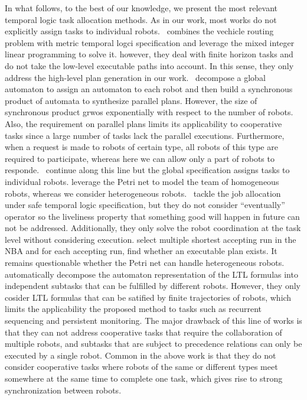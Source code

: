 \documentclass[Afour,sageh,times]{sagej}
\begin{document}
In what follows, to the best of our knowledge, we present the most relevant temporal logic task allocation methods. As in our work, most works do not explicitly assign tasks to individual robots.~\cite{karaman2011linear} combines the vechicle routing problem with metric temporal logci specification and leverage the mixed integer linear programming to solve it. however, they  deal with finite horizon tasks and do not take the low-level executable paths into account. In this sense, they only address the high-level plan generation in our work.~\cite{chen2011formal,leahy2015distributed} decompose a global automaton to assign an automaton to each robot and then  build a synchronous product of automata to synthesize parallel plans. However, the size of synchronous product grwos exponentially with respect to the number of robots. Also, the requirement on parallel plans limits its applicability to cooperative tasks since a large number of tasks lack the parallel executions. Furthermore, when a request is made to robots of certain type, all robots of this type  are required to participate, whereas here we can allow only a part of robots to responde.~\cite{ulusoy2013optimality} continue along this line but
the global specification assigns tasks to individual robots. \cite{lacerda2019petri,kloetzer2020path} leverage the Petri net to model the team of homogeneous robots, whereas we consider heterogeneous robots.~\cite{lacerda2019petri} tackle the job allocation under safe temporal logic specification, but they do not consider ``eventually'' operator so the liveliness property that something good will happen in future can not be addressed. Additionally, they only solve the robot coordination at the task level without considering execution. \cite{kloetzer2020path}  select multiple shortest accepting run in the NBA and for each accepting run, find whether an executable plan exists. It remains questionable whether the Petri net can handle heterogeneous robots. \cite{schillinger2018decomposition,schillinger2018simultaneous,faruq2018simultaneous} automatically decompose the automaton representation of the LTL formulas into independent subtasks that can be fulfilled by different robots. However, they only cosider LTL formulas that can be satified by finite trajectories of robots, which limits the applicability the proposed method to tasks such as recurrent sequencing and persistent monitoring. The major drawback of this line of works is that they can not address cooperative tasks that require the collaboration of multiple robots, and subtasks that are subject to precedence relations can only be executed by a single robot. Common in the above work is that they do not consider cooperative tasks where robots of the same or different types meet somewhere at the same time to complete one task, which gives rise to strong synchronization between robots.
\end{document}
